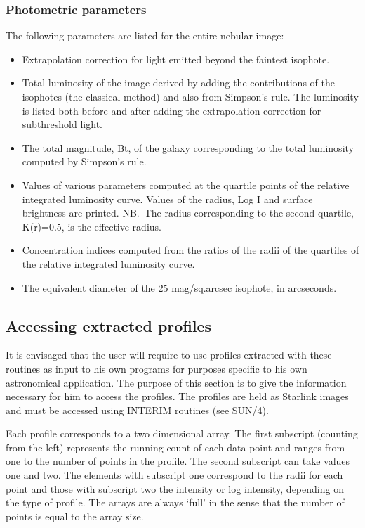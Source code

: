 \subsubsection {Photometric parameters}
The following parameters are listed for the entire nebular image:
\begin{itemize}
\item Extrapolation correction for light emitted beyond the faintest isophote.
\item Total luminosity of the image derived by adding the contributions of the
isophotes (the classical method) and also from Simpson's rule.
The luminosity is listed both before and after adding the extrapolation
correction for subthreshold light.
\item The total magnitude, Bt, of the galaxy corresponding to the total
luminosity computed by Simpson's rule.
\item Values of various parameters computed at the quartile points of the
relative integrated luminosity curve.
Values of the radius, Log I and surface brightness are printed.
NB.\ The radius corresponding to the second quartile, K(r)=0.5, is the effective
radius.
\item Concentration indices computed from the ratios of the radii of the
quartiles of the relative integrated luminosity curve.
\item The equivalent diameter of the 25 mag/sq.arcsec isophote, in arcseconds.
\end{itemize}
\subsection {Accessing extracted profiles}
It is envisaged that the user will require to use profiles extracted with these
routines as input to his own programs for purposes specific to his own
astronomical application.
The purpose of this section is to give the information necessary for him to
access the profiles.
The profiles are held as Starlink images and must be accessed using INTERIM
routines (see SUN/4).

Each profile corresponds to a two dimensional array.
The first subscript (counting from the left) represents the running count of
each data point and ranges from one to the number of points in the profile.
The second subscript can take values one and two.
The elements with subscript one correspond to the radii for each point and those
with subscript two the intensity or log intensity, depending on the type of
profile.
The arrays are always `full' in the sense that the number of points is equal to
the array size.
